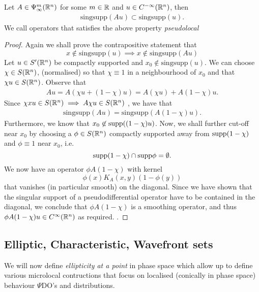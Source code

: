 \documentclass[12pt]{article}
\begin{document}
\begin{fprop}
    Let $A \in \Psi^m_\infty({\mathbb R}^n)$ for some $m \in {\ensuremath {\mathbb R}}$ and $u \in C^{-\infty}({\mathbb R}^n)$, then 
    \begin{align*}
    \mathrm{sing supp}(A u) \subset \mathrm{sing supp }(u). 
    \end{align*}
    We call operators that satisfies the above property \textit{pseudolocal}
\end{fprop}
\begin{proof}
     Again we shall prove the contrapositive statement that 
    \[
    x \not \in \mathrm{sing supp}(u) \implies x \not \in \mathrm{sing supp}(Au)
    \]
    Let $u \in S'({\mathbb R}^n)$ be compactly supported and $x_0 \not \in \mathrm{sing supp}(u)$.  We can choose $\chi \in S({\mathbb R}^n)$, (normalised) so that $\chi \equiv 1$ in a neighbourhood of $x_0$ and that $\chi u \in S({\mathbb R}^n)$. Observe that 
    \begin{align*}
    Au = A(\chi u + (1 - \chi)u) = A(\chi u) + A(1 - \chi)u. 
    \end{align*}
    Since $\chi xu \in S({\mathbb R}^n) \implies A\chi u \in S({\mathbb R}^n)$ \cite{rbm lemma 2.3}, we have that 
    \begin{align*}
    \mathrm{singsupp}(Au) = \mathrm{singsupp}(A(1 - \chi)u). 
    \end{align*}
    Furthermore, we know that $x_0 \not \in \mathrm{supp}((1 - \chi)u)$. 
    Now, we shall further cut-off near $x_0$ by choosing a $\phi \in S({\mathbb R}^n)$ compactly supported  away from $\mathrm{supp}(1 - \chi)$ and $\phi \equiv 1$ near $x_0$, i.e. 
    \[
    \mathrm{supp}(1 - \chi) \cap \mathrm{supp} \phi = \emptyset. 
    \]
    We now have an operator $\phi A(1 - \chi) $ with kernel
    \[
    \phi(x) K_A(x, y) ( 1 - \phi(y))
    \]
    that vanishes (in particular smooth) on the diagonal. Since we have shown that the singular support of a pseudodifferential operator have to be contained in the diagonal, we conclude that $\phi A(1 - \chi)$ is a smoothing operator, and thus $\phi A (1 - \chi) u \in C^\infty({\mathbb R}^n)$ as required. .  
\end{proof}


\subsection{Elliptic, Characteristic, Wavefront sets}
We will now define \textit{ellipticity at a point} in phase space which allow up to define various microlocal contructions that focus on  localised (conically in phase space) behaviour $\Psi$DO's and distributions. 
\end{document}
